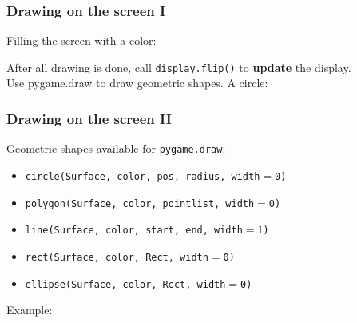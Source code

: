 \documentclass[handout]{beamer}   %
\begin{document}

\begin{frame}
\frametitle{Drawing on the screen I}
Filling the screen with a color:

\screenFill
\pause
After all drawing is done, call \textcolor{tg}{\texttt{display.flip()}} to \textbf{update} the display.\\
\bigskip
\medskip
\pause
Use pygame.draw to draw geometric shapes. A circle:
\drawCircle

\end{frame}




\begin{frame}
\frametitle{Drawing on the screen II}

Geometric shapes available for \textcolor{tg}{\texttt{pygame.draw}}:
\medskip
\begin{itemize}
\pause
\item[] \textcolor{tg}{\texttt{circle(Surface, color, pos, radius, width$=$0)}}
\pause
\item[] \textcolor{tg}{\texttt{\mbox{polygon(Surface, color, pointlist, width$=$0)}}}
\pause
\item[] \textcolor{tg}{\texttt{line(Surface, color, start, end, width$=1$)}}
\pause
\item[] \textcolor{tg}{\texttt{rect(Surface, color, Rect, width$=$0)}}
\pause
\item[] \textcolor{tg}{\texttt{ellipse(Surface, color, Rect, width$=$0)}}
\end{itemize}
\bigskip
\medskip
\pause
Example:
\redLine

\end{frame}


\end{document}
